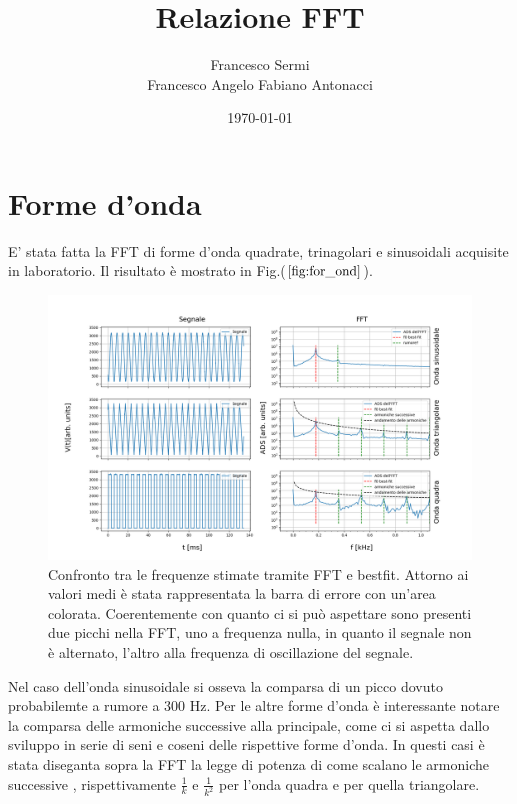 \documentclass{article}
\author{Francesco Sermi\\Francesco Angelo Fabiano Antonacci}
\date{\today}
\title{Relazione FFT}
\begin{document}
\maketitle

\section{Forme d'onda}
    \label{sez:for_ond}
    
    E' stata fatta la FFT di forme d'onda quadrate, trinagolari e sinusoidali
    acquisite in laboratorio.
    Il risultato è mostrato in Fig.($\ref{fig:for_ond}$).

        \begin{figure}[H]
            \centering
            \includegraphics[scale=0.45]{FFT5/FFTwaveforms1.png}
            \caption{Confronto tra le frequenze stimate tramite FFT e bestfit.
                    Attorno ai valori medi è stata rappresentata la barra di errore 
                    con un'area colorata.
                    Coerentemente con quanto ci si può aspettare sono presenti due picchi nella FFT,
                    uno a frequenza nulla, in quanto il segnale non è alternato, l'altro
                    alla frequenza di oscillazione del segnale.}
            \label{fig:for_ond}
        \end{figure}    

    Nel caso dell'onda sinusoidale si osseva la comparsa di un picco dovuto probabilemte
    a rumore a $300$ Hz.
    Per le altre forme d'onda è interessante notare la comparsa delle 
    armoniche successive alla principale, come ci si aspetta dallo 
    sviluppo in serie di seni e coseni delle rispettive forme d'onda.
    In questi casi è stata diseganta sopra la FFT
    la legge di potenza di come scalano le armoniche successive , rispettivamente
    $\frac{1}{k}$ e $\frac{1}{k^2}$ per l'onda quadra e  per quella triangolare.
\end{document}
